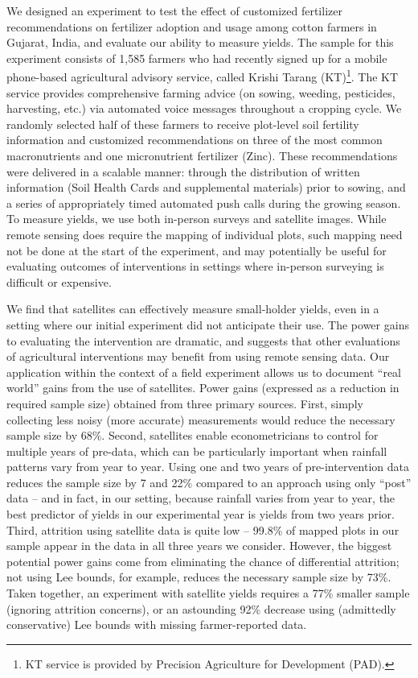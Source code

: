 \documentclass{article}
\begin{document}
We designed an experiment to test the effect of customized fertilizer recommendations on fertilizer adoption and usage among cotton farmers in Gujarat, India, and evaluate our ability to measure yields. The sample for this experiment consists of 1,585 farmers who had recently signed up for a mobile phone-based agricultural advisory service, called Krishi Tarang (KT)\footnote{KT service is provided by Precision Agriculture for Development (PAD).}. The KT service provides comprehensive farming advice (on sowing, weeding, pesticides, harvesting, etc.) via automated voice messages throughout a cropping cycle. We randomly selected half of these farmers to receive plot-level soil fertility information and customized recommendations on three of the most common macronutrients and one micronutrient fertilizer (Zinc). These recommendations were delivered in a scalable manner: through the distribution of written information (Soil Health Cards and supplemental materials) prior to sowing, and a series of appropriately timed automated push calls during the growing season. To measure yields, we use both in-person surveys and satellite images. While remote sensing does require the mapping of individual plots, such mapping need not be done at the start of the experiment, and may potentially be useful for evaluating outcomes of interventions in settings where in-person surveying is difficult or expensive.

We find that satellites can effectively measure small-holder yields, even in a setting where our initial experiment did not anticipate their use. The power gains to evaluating the intervention are dramatic, and suggests that other evaluations of agricultural interventions may benefit from using remote sensing data. Our application within the context of a field experiment allows us to document ``real world'' gains from the use of satellites. Power gains (expressed as a reduction in required sample size) obtained from three primary sources. First, simply collecting less noisy (more accurate) measurements would reduce the necessary sample size by 68\%. Second, satellites enable econometricians to control for multiple years of pre-data, which can be particularly important when rainfall patterns vary from year to year. Using one and two years of pre-intervention data reduces the sample size by 7 and 22\% compared to an approach using only ``post'' data -- and in fact, in our setting, because rainfall varies from year to year, the best predictor of yields in our experimental year is yields from two years prior. Third, attrition using satellite data is quite low -- 99.8\% of mapped plots in our sample appear in the data in all three years we consider. However, the biggest potential power gains come from eliminating the chance of differential attrition; not using Lee bounds, for example, reduces the necessary sample size by 73\%. Taken together, an experiment with satellite yields requires a 77\% smaller sample (ignoring attrition concerns), or an astounding 92\% decrease using (admittedly conservative) Lee bounds with missing farmer-reported data.
\end{document}
